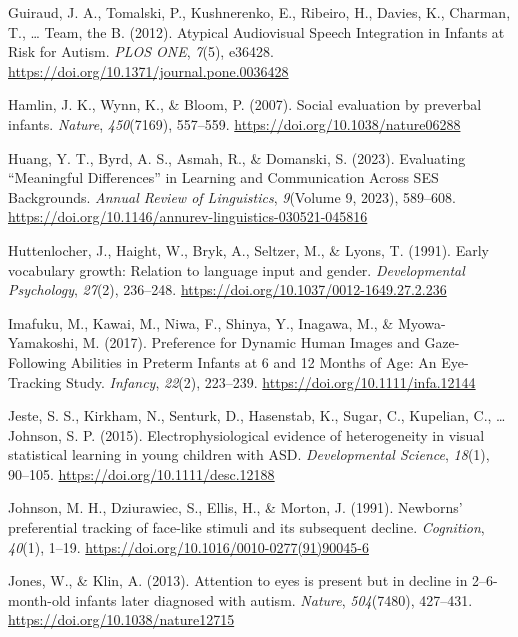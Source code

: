 \documentclass[
  english,
  man,floatsintext]{apa6}
\newlength{\cslhangindent}
\newenvironment{CSLReferences}[2] %
 {\begin{list}{}{%
  \setlength{\itemindent}{0pt}
  \setlength{\leftmargin}{0pt}
  \setlength{\parsep}{0pt}
  \ifodd #1
   \setlength{\leftmargin}{\cslhangindent}
   \setlength{\itemindent}{-1\cslhangindent}
  \fi
  \setlength{\itemsep}{#2\baselineskip}}}
 {\end{list}}
\begin{document}
\begin{CSLReferences}{1}{0}
{Guiraud, J. A., Tomalski, P., Kushnerenko, E., Ribeiro, H., Davies, K., Charman, T., \ldots{} Team, the B.} (2012). Atypical {Audiovisual Speech Integration} in {Infants} at {Risk} for {Autism}. \emph{PLOS ONE}, \emph{7}(5), e36428. \url{https://doi.org/10.1371/journal.pone.0036428}

Hamlin, J. K., Wynn, K., \& Bloom, P. (2007). Social evaluation by preverbal infants. \emph{Nature}, \emph{450}(7169), 557--559. \url{https://doi.org/10.1038/nature06288}

Huang, Y. T., Byrd, A. S., Asmah, R., \& Domanski, S. (2023). Evaluating {``{Meaningful Differences}''} in {Learning} and {Communication Across SES Backgrounds}. \emph{Annual Review of Linguistics}, \emph{9}(Volume 9, 2023), 589--608. \url{https://doi.org/10.1146/annurev-linguistics-030521-045816}

Huttenlocher, J., Haight, W., Bryk, A., Seltzer, M., \& Lyons, T. (1991). Early vocabulary growth: {Relation} to language input and gender. \emph{Developmental Psychology}, \emph{27}(2), 236--248. \url{https://doi.org/10.1037/0012-1649.27.2.236}

Imafuku, M., Kawai, M., Niwa, F., Shinya, Y., Inagawa, M., \& Myowa-Yamakoshi, M. (2017). Preference for {Dynamic Human Images} and {Gaze-Following Abilities} in {Preterm Infants} at 6 and 12 {Months} of {Age}: {An Eye-Tracking Study}. \emph{Infancy}, \emph{22}(2), 223--239. \url{https://doi.org/10.1111/infa.12144}

Jeste, S. S., Kirkham, N., Senturk, D., Hasenstab, K., Sugar, C., Kupelian, C., \ldots{} Johnson, S. P. (2015). Electrophysiological evidence of heterogeneity in visual statistical learning in young children with {ASD}. \emph{Developmental Science}, \emph{18}(1), 90--105. \url{https://doi.org/10.1111/desc.12188}

Johnson, M. H., Dziurawiec, S., Ellis, H., \& Morton, J. (1991). Newborns' preferential tracking of face-like stimuli and its subsequent decline. \emph{Cognition}, \emph{40}(1), 1--19. \url{https://doi.org/10.1016/0010-0277(91)90045-6}

Jones, W., \& Klin, A. (2013). Attention to eyes is present but in decline in 2--6-month-old infants later diagnosed with autism. \emph{Nature}, \emph{504}(7480), 427--431. \url{https://doi.org/10.1038/nature12715}


\end{CSLReferences}
\end{document}
